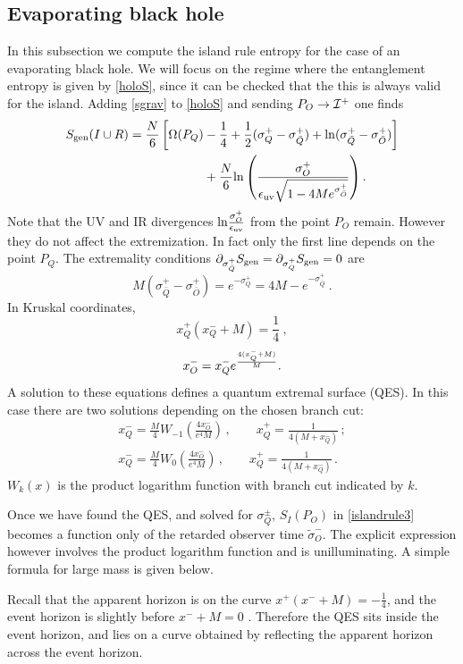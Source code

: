 \documentclass[11pt,oneside,letterpaper]{article}
\newcommand{\p}{\partial}
\newcommand{\f}{\frac}
\newcommand{\be}{\begin{equation}}
\newcommand{\ee}{\end{equation}}
\def\be{\begin{eqnarray}}
\def\ee{\end{eqnarray}}
\let\s=\sigma \let\t=\tau \let\u=\upsilon \let\c=\chi
\let\f=\frac
\def\be{\begin{equation}}
\def\ee{\end{equation}}
\def\m{{M}}
\def\log{{\rm ln}}
\renewcommand{\p}{\partial}
\numberwithin{equation}{section}
\def \be {\begin{equation}}
\def \ee {\end{equation}}
\begin{document}
\subsection{Evaporating black hole}
In this subsection we compute the island rule entropy for the case of an evaporating black hole. We will focus on the regime where the entanglement entropy is given by \eqref{holoS}, since it can be checked that the this is always valid for the island.
Adding \eqref{sgrav} to \eqref{holoS} and sending  $P_O \to {\cal I}^+$ one finds  
\begin{align}\label{he}
S_{\rm gen}(I \cup R) &= \frac{N}{6}\left[\Omega(P_Q) -{1 \over 4}+  \frac{1}{2}(\s^+_{Q}  - \s^+_{\bar Q} ) + \log (\s^+_{\bar Q}  - \s^+_{\bar O} ) 
\right]  \\
& \qquad \qquad \qquad  + \frac{N}{6}\log \left( \frac{\s^+_{O} }{\epsilon_{\text{uv}}\sqrt{1-4\m e^{ \s^+_{\bar O} } }} \right). \notag
\end{align}
Note that the UV and IR divergences $\log \f{\s^+_O}{\epsilon_{\text{uv}}}$ from the point $P_O$ remain. However they do not affect the extremization. 
In fact only the first line depends on the point $P_Q$. The extremality conditions $\p_{\s^+_{\bar Q} }S_{\rm gen} = \p_{\s^+_{Q} } S_{\rm gen} = 0$ are
\be
\m(\s^+_{\bar Q}  - \s^+_{\bar O} ) = e^{- \s^+_{Q} }  = {4\m} - e^{- \s^+_{\bar Q} }  \ .
\ee
In Kruskal coordinates,
\be\label{kruskalQES}
x_Q^+  (x_Q^- + {\m}) = \frac{1}{4} \ , \ee
\be \label{xqo}x^-_O=x^-_Qe^{4(x^-_Q+\m )\over \m}.
\ee
A solution to these equations defines a quantum extremal surface (QES). In this case there are two solutions  depending on the chosen branch cut:
\begin{align}
x_Q^ - = \f{\m}{4}W_{-1}\left(\f{4x_O^- }{e^4\m}\right)\,,\qquad x_Q^+ = \f{1}{4(\m+x_Q^-)}\,;\label{domQES}\\
x_Q^ - = \f{\m}{4}W_0\left(\f{4x_O^- }{e^4\m}\right)\,,\qquad x_Q^+ = \f{1}{4(\m+x_Q^-)}\,.\label{subdomQES}
\end{align} 
$W_k(x)$ is the product logarithm function with branch cut indicated by $k$. 


Once we have found the QES, and solved for $\s^\pm_Q$, $S_I (P_O)$ in  \eqref{islandrule3} becomes a function only of the retarded observer time $\tilde \s^-_O$. The explicit expression however involves the product logarithm function and is unilluminating. A simple formula for large mass is given below. 


Recall that the apparent horizon is on the curve $x^+  (x^- + {\m}{}) = - \frac{1}{4}$, and the event horizon is slightly before $x^-+ {\m}{}=0$ . Therefore the QES sits inside the event horizon, and lies on a curve obtained by reflecting the apparent horizon across the event horizon.
\end{document}

